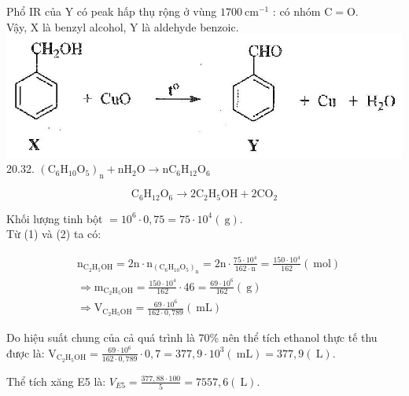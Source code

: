 \documentclass[10pt]{article}
\begin{document}
Phổ IR của Y có peak hấp thụ rộng ở vùng $1700 \mathrm{~cm}^{-1}$ : có nhóm $\mathrm{C}=\mathrm{O}$.\\
Vậy, X là benzyl alcohol, Y là aldehyde benzoic.\\
\includegraphics[max width=\textwidth, center]{2025_10_23_ed7118e3280f74e91193g-33}\\
20.32. $\left(\mathrm{C}_{6} \mathrm{H}_{10} \mathrm{O}_{5}\right)_{\mathrm{n}}+\mathrm{nH}_{2} \mathrm{O} \rightarrow \mathrm{nC}_{6} \mathrm{H}_{12} \mathrm{O}_{6}$


\begin{equation*}
\mathrm{C}_{6} \mathrm{H}_{12} \mathrm{O}_{6} \rightarrow 2 \mathrm{C}_{2} \mathrm{H}_{5} \mathrm{OH}+2 \mathrm{CO}_{2} \tag{1}
\end{equation*}


Khối lượng tinh bột $=10^{6} \cdot 0,75=75 \cdot 10^{4}(\mathrm{~g})$.\\
Từ (1) và (2) ta có:

$$
\begin{aligned}
& \mathrm{n}_{\mathrm{C}_{2} \mathrm{H}_{5} \mathrm{OH}}=2 \mathrm{n} \cdot \mathrm{n}_{\left(\mathrm{C}_{6} \mathrm{H}_{10} \mathrm{O}_{5}\right)_{\mathrm{n}}}=2 \mathrm{n} \cdot \frac{75 \cdot 10^{4}}{162 \cdot \mathrm{n}}=\frac{150 \cdot 10^{4}}{162}(\mathrm{~mol}) \\
& \Rightarrow \mathrm{m}_{\mathrm{C}_{2} \mathrm{H}_{5} \mathrm{OH}}=\frac{150 \cdot 10^{4}}{162} \cdot 46=\frac{69 \cdot 10^{6}}{162}(\mathrm{~g}) \\
& \Rightarrow \mathrm{V}_{\mathrm{C}_{2} \mathrm{H}_{5} \mathrm{OH}}=\frac{69 \cdot 10^{6}}{162 \cdot 0,789}(\mathrm{~mL})
\end{aligned}
$$

Do hiệu suất chung của cả quá trình là 70\% nên thể tích ethanol thực tế thu được là: $\mathrm{V}_{\mathrm{C}_{2} \mathrm{H}_{5} \mathrm{OH}}=\frac{69 \cdot 10^{6}}{162 \cdot 0,789} \cdot 0,7=377,9 \cdot 10^{3}(\mathrm{~mL})=377,9(\mathrm{~L})$.

Thể tích xăng E5 là: $V_{E 5}=\frac{377,88 \cdot 100}{5}=7557,6(\mathrm{~L})$.
\end{document}
